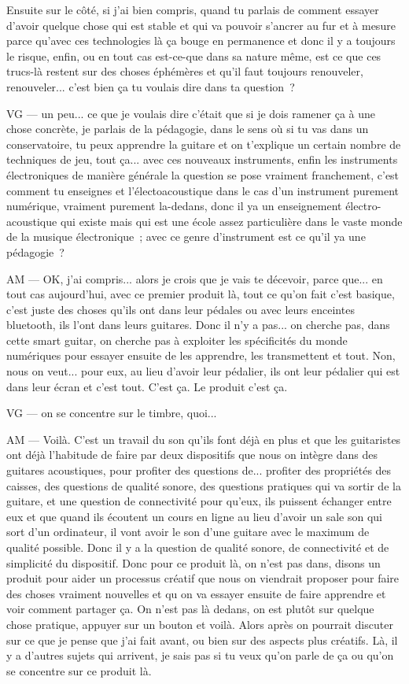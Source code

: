 Ensuite sur le côté, si j'ai bien compris, quand tu parlais de comment essayer d'avoir quelque chose qui est stable et qui va pouvoir s'ancrer au fur et à mesure parce qu'avec ces technologies là ça bouge en permanence et donc il y a toujours le risque, enfin, ou en tout cas est-ce-que dans sa nature même, est ce que ces trucs-là restent sur des choses éphémères et qu'il faut toujours renouveler, renouveler... c'est bien ça tu voulais dire dans ta question ?

VG —  un peu... ce que je voulais dire c'était que si je dois ramener ça à une chose concrète, je parlais de la pédagogie, dans le sens où si tu vas dans un conservatoire, tu peux apprendre la guitare et on t'explique un certain nombre de techniques de jeu, tout ça... avec ces nouveaux instruments, enfin les instruments électroniques de manière générale la question se pose vraiment franchement, c'est comment tu enseignes et l'électoacoustique dans le cas d'un instrument purement numérique, vraiment purement la-dedans, donc il ya un enseignement électro-acoustique qui existe mais qui est une école assez particulière dans le vaste monde de la musique électronique ; avec ce genre d'instrument est ce qu'il ya une pédagogie ?

AM — OK, j'ai compris... alors je crois que je vais te décevoir, parce que... en tout cas aujourd'hui, avec ce premier produit là, tout ce qu'on fait c'est basique, c'est juste des choses qu'ils ont dans leur pédales ou avec leurs enceintes bluetooth, ils l'ont dans leurs guitares. Donc il n'y a pas... on cherche pas, dans cette smart guitar, on cherche pas à exploiter les spécificités du monde numériques pour essayer ensuite de les apprendre, les transmettent et tout. Non, nous on veut... pour eux, au lieu d'avoir leur pédalier, ils ont leur pédalier qui est dans leur écran et c'est tout. C'est ça. Le produit c'est ça. 

VG — on se concentre sur le timbre, quoi... 

AM —  Voilà. C'est un travail du son qu'ils font déjà en plus et que les guitaristes ont déjà l'habitude de faire par deux dispositifs que nous on intègre dans des guitares acoustiques, pour profiter des questions de... profiter des propriétés des caisses, des questions de qualité sonore, des questions pratiques qui va sortir de la guitare, et une question de connectivité pour qu'eux, ils puissent échanger entre eux et que quand ils écoutent un cours en ligne au lieu d'avoir un sale son qui sort d'un ordinateur, il vont avoir le son d'une guitare avec le maximum de qualité possible. Donc il y a la question de qualité sonore, de connectivité et de simplicité du dispositif. Donc pour ce produit là, on n'est pas dans, disons un produit pour aider un processus créatif que nous on viendrait proposer pour faire des choses vraiment nouvelles et qu on va essayer ensuite de faire apprendre et voir comment partager ça. On n'est pas là dedans, on est plutôt sur quelque chose pratique, appuyer sur un bouton et voilà. Alors après on pourrait discuter sur ce que je pense que j'ai fait avant, ou bien sur des aspects plus créatifs. Là, il y a d'autres sujets qui arrivent, je sais pas si tu veux qu'on parle de ça ou qu'on se concentre sur ce produit là. 

